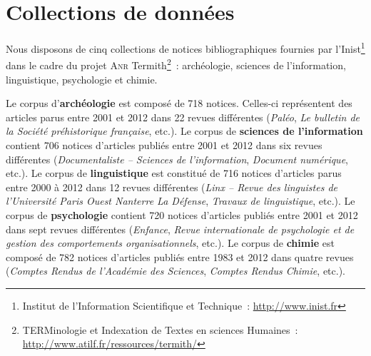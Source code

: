 \section{Collections de données}
\label{sec:presentation_des_donnees}
  Nous disposons de cinq collections de notices bibliographiques fournies par
  l'Inist\footnote{Institut de l'Information Scientifique et Technique~:
  \url{http://www.inist.fr}} dans le cadre du projet \textsc{Anr}
  Termith\footnote{TERMinologie et Indexation de Textes en sciences Humaines~:
  \url{http://www.atilf.fr/ressources/termith/}}~: archéologie, sciences de
  l'information, linguistique, psychologie et chimie.

  Le corpus d'\textbf{archéologie} est composé de 718 notices. Celles-ci
  représentent des articles parus entre 2001 et 2012 dans 22 revues différentes
  (\textit{Paléo}, \textit{Le bulletin de la Société préhistorique française},
  etc.).
  Le corpus de \textbf{sciences de l'information} contient 706 notices
  d'articles publiés entre 2001 et 2012 dans six revues différentes
  (\textit{Documentaliste -- Sciences de l'information}, \textit{Document
  numérique}, etc.).
  Le corpus de \textbf{linguistique} est constitué de 716 notices d'articles
  parus entre 2000 à 2012 dans 12 revues différentes (\textit{Linx -- Revue des
  linguistes de l'Université Paris Ouest Nanterre La Défense}, \textit{Travaux
  de linguistique}, etc.).
  Le corpus de \textbf{psychologie} contient 720 notices d'articles publiés
  entre 2001 et 2012 dans sept revues différentes (\textit{Enfance},
  \textit{Revue internationale de psychologie et de gestion des comportements
  organisationnels}, etc.).
  Le corpus de \textbf{chimie} est composé de 782 notices d'articles publiés
  entre 1983 et 2012 dans quatre revues (\textit{Comptes Rendus de l'Académie
  des Sciences}, \textit{Comptes Rendus Chimie}, etc.).

